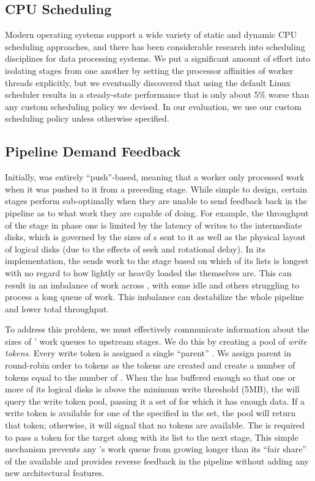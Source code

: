 \subsection{CPU Scheduling}

Modern operating systems support a wide variety of static and dynamic CPU
scheduling approaches, and there has been considerable research into scheduling
disciplines for data processing systems.  We put a significant amount of effort
into isolating stages from one another by setting the processor affinities of
worker threads explicitly, but we eventually discovered that using the default
Linux scheduler results in a steady-state performance that is only about 5\%
worse than any custom scheduling policy we devised.  In our evaluation, we use
our custom scheduling policy unless otherwise specified.

\subsection{Pipeline Demand Feedback}
\label{sec:tritonsort-disk-scheduler}

Initially, \tritonsort was entirely ``push''-based, meaning that a worker only
processed work when it was pushed to it from a preceding stage.  While simple
to design, certain stages perform sub-optimally when they are unable to send
feedback back in the pipeline as to what work they are capable of doing.  For
example, the throughput of the \writer stage in phase one is limited by the
latency of writes to the intermediate disks, which is governed by the sizes of
\writerbuffer{}s sent to it as well as the physical layout of logical disks
(due to the effects of seek and rotational delay).  In its \naive
implementation, the \ldts sends work to the \writer stage based on which of its
\ldbuffer lists is longest with no regard to how lightly or heavily loaded the
\writers themselves are.  This can result in an imbalance of work across
\writers, with some \writers idle and others struggling to process a long queue
of work.  This imbalance can destabilize the whole pipeline and lower total
throughput.

To address this problem, we must effectively communicate information about the
sizes of \writers' work queues to upstream stages.  We do this by creating a
pool of \emph{write tokens}. Every write token is assigned a single ``parent''
\writer. We assign parent \writers in round-robin order to tokens as the tokens
are created and create a number of tokens equal to the number of
\writerbuffers.
When the \ldts has buffered enough \ldbuffers so that one or more of its logical
disks is above the minimum write threshold (5MB), the \ldts will query the
write token pool, passing it a set of \writers for which it has enough data.
If a write token is available for one of the specified \writers in the set, the
pool will return that token; otherwise, it will signal that no tokens are
available.  The \ldts is required to pass a token for the target \writer along
with its \ldbuffer list to the next stage, This simple mechanism prevents any
\writer's work queue from growing longer than its ``fair share'' of the
available \writerbuffers and provides reverse feedback in the pipeline without
adding any new architectural features.

